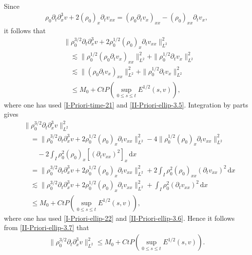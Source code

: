 \documentclass[11pt, reqno]{amsart}
\newcommand{\diff}{\mathrm{d}}
\numberwithin{equation}{section}
\begin{document}
Since
\begin{equation*}
\begin{aligned}
\rho_0\partial_t\partial_x^3v+2(\rho_0)_{x}\partial_tv_{xx}=
(\rho_0\partial_tv_x)_{xx}-(\rho_0)_{xx}\partial_tv_x,
\end{aligned}
\end{equation*}
it follows that
\begin{equation}\label{II-Priori-ellip-3.6}
\begin{aligned}
&\|\rho_0^{3/2}\partial_t\partial_x^3v+2\rho_0^{1/2}(\rho_0)_{x}\partial_tv_{xx}\|_{L^2}^2\\
&\quad\lesssim \|\rho_0^{1/2}(\rho_0\partial_tv_x)_{xx}\|_{L^2}^2+\|\rho_0^{1/2}\partial_tv_x\|_{L^2}^2\\
&\quad\lesssim \|(\rho_0\partial_tv_x)_{xx}\|_{L^2}^2+\|\rho_0^{1/2}\partial_tv_x\|_{L^2}^2\\
&\quad\leq M_0+Ct P(\sup_{0\leq s\leq t}E^{1/2}(s,v)),
\end{aligned}
\end{equation}
where one has used \eqref{I-Priori-time-21} and \eqref{II-Priori-ellip-3.5}.
Integration by parts gives
\begin{equation}\label{II-Priori-ellip-3.7}
\begin{aligned}
&\|\rho_0^{3/2}\partial_t\partial_x^3v\|_{L^2}^2\\
&\quad=\|\rho_0^{3/2}\partial_t\partial_x^3v+2\rho_0^{1/2}(\rho_0)_{x}\partial_tv_{xx}\|_{L^2}^2
-4\|\rho_0^{1/2}(\rho_0)_{x}\partial_tv_{xx}\|_{L^2}^2\\
&\qquad-2\int_I\rho_0^2(\rho_0)_x[(\partial_tv_{xx})^2]_x\,\diff x\\
&\quad=\|\rho_0^{3/2}\partial_t\partial_x^3v+2\rho_0^{1/2}(\rho_0)_{x}\partial_tv_{xx}\|_{L^2}^2
+2\int_I\rho_0^2(\rho_0)_{xx}(\partial_tv_{xx})^2\,\diff x\\
&\quad\lesssim \|\rho_0^{3/2}\partial_t\partial_x^3v+2\rho_0^{1/2}(\rho_0)_{x}\partial_tv_{xx}\|_{L^2}^2
+
\int_I\rho_0^2(\partial_tv_{xx})^2\,\diff x\\
&\quad\leq M_0+Ct P(\sup_{0\leq s\leq t}E^{1/2}(s,v)),
\end{aligned}
\end{equation}
where one has used  \eqref{I-Priori-ellip-22} and \eqref{II-Priori-ellip-3.6}.
Hence it follows from \eqref{II-Priori-ellip-3.7} that
\begin{equation}\label{II-Priori-ellip-4}
\begin{aligned}
\|\rho_0^{3/2}\partial_t\partial_x^3v\|_{L^2}^2
\leq M_0+Ct P(\sup_{0\leq s\leq t}E^{1/2}(s,v)).
\end{aligned}
\end{equation}
\end{document}
